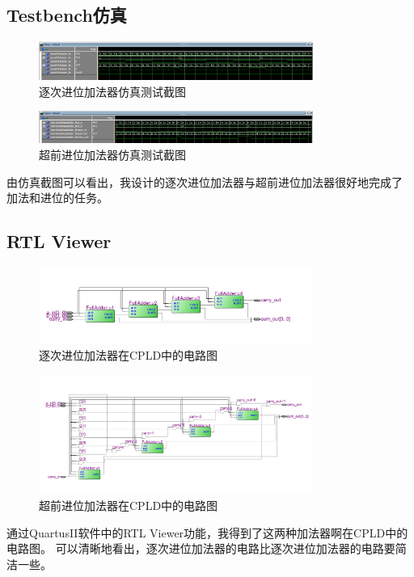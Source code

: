 \documentclass[UTF8]{article}
\begin{document}
\subsection{Testbench仿真}
\begin{figure}[h]
    \label{md}
    \centering
        \includegraphics[width=0.8\textwidth]{SFA.png}
        \caption{逐次进位加法器仿真测试截图}
    \end{figure}
    \begin{figure}[h]
        \label{md}
        \centering
            \includegraphics[width=0.8\textwidth]{CLA.png}
            \caption{超前进位加法器仿真测试截图}
        \end{figure}

由仿真截图可以看出，我设计的逐次进位加法器与超前进位加法器很好地完成了
加法和进位的任务。
\clearpage

\subsection{RTL Viewer}
\begin{figure}[h]
    \label{md}
    \centering
        \includegraphics[width=0.8\textwidth]{Serial4FullAdder.png}
        \caption{逐次进位加法器在CPLD中的电路图}
    \end{figure}
    \begin{figure}[h]
        \label{md}
        \centering
            \includegraphics[width=0.8\textwidth]{CarryLookAheadAdder.png}
            \caption{超前进位加法器在CPLD中的电路图}
        \end{figure}
通过QuartusII软件中的RTL Viewer功能，我得到了这两种加法器啊在CPLD中的电路图。
可以清晰地看出，逐次进位加法器的电路比逐次进位加法器的电路要简洁一些。
\end{document}
